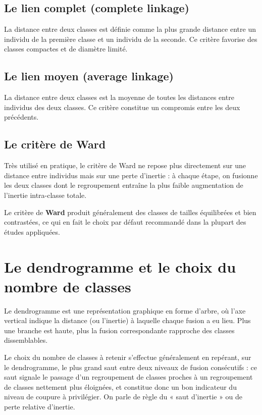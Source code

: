 \documentclass[11pt,a4paper]{report}
\begin{document}
	\subsection{Le lien complet (complete linkage)}
	La distance entre deux classes est définie comme la plus grande distance entre un individu de la première classe et un individu de la seconde. Ce critère favorise des classes compactes et de diamètre limité.
	
	\subsection{Le lien moyen (average linkage)}
	La distance entre deux classes est la moyenne de toutes les distances entre individus des deux classes. Ce critère constitue un compromis entre les deux précédents.
	
	\subsection{Le critère de Ward}
	Très utilisé en pratique, le critère de Ward ne repose plus directement sur une distance entre individus mais sur une perte d'inertie : à chaque étape, on fusionne les deux classes dont le regroupement entraîne la plus faible augmentation de l'inertie intra-classe totale.
	
	\begin{retenir}
		Le critère de \textbf{Ward} produit généralement des classes de tailles équilibrées et bien contrastées, ce qui en fait le choix par défaut recommandé dans la plupart des études appliquées.
	\end{retenir}
	
	\section{Le dendrogramme et le choix du nombre de classes}
	
	Le dendrogramme est une représentation graphique en forme d'arbre, où l'axe vertical indique la distance (ou l'inertie) à laquelle chaque fusion a eu lieu. Plus une branche est haute, plus la fusion correspondante rapproche des classes dissemblables.
	
	Le choix du nombre de classes à retenir s'effectue généralement en repérant, sur le dendrogramme, le plus grand saut entre deux niveaux de fusion consécutifs : ce saut signale le passage d'un regroupement de classes proches à un regroupement de classes nettement plus éloignées, et constitue donc un bon indicateur du niveau de coupure à privilégier. On parle de règle du « saut d'inertie » ou de perte relative d'inertie.
	
\end{document}
